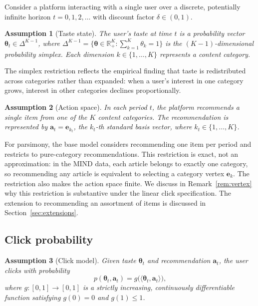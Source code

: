 \documentclass[11pt]{article}
\newtheorem{assumption}{Assumption}
\newcommand{\R}{\mathbb{R}}
\begin{document}
Consider a platform interacting with a single user over a discrete, potentially infinite horizon $t = 0, 1, 2, \ldots$ with discount factor $\delta \in (0,1)$.

\begin{assumption}[Taste state]\label{as:taste}
The user's taste at time $t$ is a probability vector $\boldsymbol{\theta}_t \in \Delta^{K-1}$, where $\Delta^{K-1} = \{\boldsymbol{\theta} \in \R_+^K : \sum_{k=1}^K \theta_k = 1\}$ is the $(K{-}1)$-dimensional probability simplex. Each dimension $k \in \{1, \ldots, K\}$ represents a content category.
\end{assumption}

The simplex restriction reflects the empirical finding that taste is redistributed across categories rather than expanded: when a user's interest in one category grows, interest in other categories declines proportionally.

\begin{assumption}[Action space]\label{as:action}
In each period $t$, the platform recommends a single item from one of the $K$ content categories. The recommendation is represented by $\mathbf{a}_t = \mathbf{e}_{k_t}$, the $k_t$-th standard basis vector, where $k_t \in \{1, \ldots, K\}$.
\end{assumption}

For parsimony, the base model considers recommending one item per period and restricts to pure-category recommendations. This restriction is exact, not an approximation: in the MIND data, each article belongs to exactly one category, so recommending any article is equivalent to selecting a category vertex $\mathbf{e}_k$. The restriction also makes the action space finite. We discuss in Remark~\ref{rem:vertex} why this restriction is substantive under the linear click specification. The extension to recommending an assortment of items is discussed in Section~\ref{sec:extensions}.

\subsection{Click probability}

\begin{assumption}[Click model]\label{as:click}
Given taste $\boldsymbol{\theta}_t$ and recommendation $\mathbf{a}_t$, the user clicks with probability
\[
p(\boldsymbol{\theta}_t, \mathbf{a}_t) = g\bigl(\langle \boldsymbol{\theta}_t, \mathbf{a}_t \rangle\bigr),
\]
where $g: [0,1] \to [0,1]$ is a strictly increasing, continuously differentiable function satisfying $g(0) = 0$ and $g(1) \le 1$.
\end{assumption}
\end{document}
